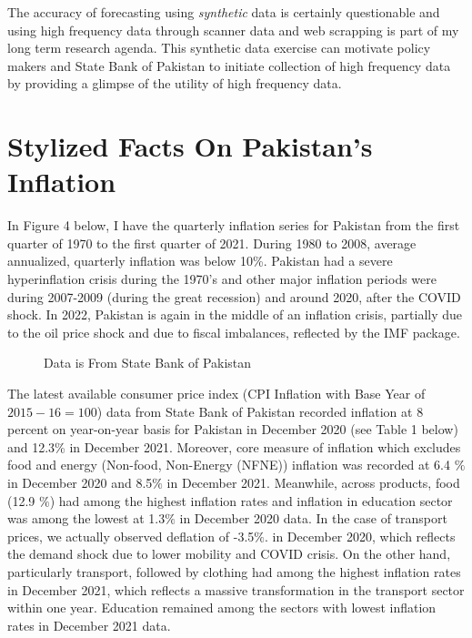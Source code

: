 \documentclass[12pt]{article}
\newcommand{\1}{\mathbbm 1}
\begin{document}
		The accuracy of forecasting using \textit{synthetic} data is certainly questionable and using high frequency data through scanner data and web scrapping is part of my long term research agenda. This synthetic data exercise can motivate policy makers and State Bank of Pakistan to initiate collection of high frequency data by providing a glimpse of the utility of high frequency data.
		
		
		
		
		
		
		
		
		
		
		
		
		\section{Stylized Facts On Pakistan's Inflation}
		
		In Figure 4 below, I have the quarterly inflation series for Pakistan from the first quarter of 1970 to the first quarter of 2021. During 1980 to 2008, average annualized, quarterly inflation was below 10\%. Pakistan had a severe hyperinflation crisis during the 1970's and other major inflation periods were during 2007-2009 (during the great recession) and around 2020, after the COVID shock. In 2022, Pakistan is again in the middle of an inflation crisis, partially due to the oil price shock and due to fiscal imbalances, reflected by the IMF package.
		
		
		
		
		
		
		
		
		\begin{figure}[H]
			\centering
			\scalebox{0.6}{}
			\hfill
			\caption{Data is From State Bank of Pakistan}
		\end{figure}
		
		
		
		
		
		The latest available consumer price index (CPI Inflation with Base Year of $2015-16 =100$) data from State Bank of Pakistan recorded inflation at 8 percent on year-on-year basis for Pakistan in December 2020 (see Table 1 below) and 12.3\% in December 2021. Moreover, core measure of inflation which excludes food and energy (Non-food, Non-Energy (NFNE)) inflation was recorded at 6.4 $\%$ in December 2020 and 8.5$\%$ in December 2021. Meanwhile, across products, food (12.9 $\%$) had among the highest inflation rates and inflation in education sector was among the lowest at 1.3$\%$ in December 2020 data. In the case of transport prices, we actually observed deflation of -3.5$\%$. in December 2020, which reflects the demand shock due to lower mobility and COVID crisis. On the other hand, particularly transport, followed by clothing had among the highest inflation rates in December 2021, which reflects a massive transformation in the transport sector within one year. Education remained among the sectors with lowest inflation rates in December 2021 data.
		
\end{document}
